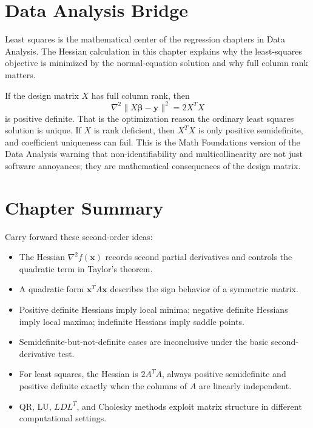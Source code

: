 \section{Data Analysis Bridge}
\label{mf:ch13-data-analysis-bridge}

Least squares is the mathematical center of the regression chapters in Data Analysis. The Hessian calculation in this chapter explains why the least-squares objective is minimized by the normal-equation solution and why full column rank matters.

If the design matrix \(X\) has full column rank, then
\[
    \nabla^2\|X\boldsymbol{\beta}-\mathbf{y}\|^2
    =2X^TX
\]
is positive definite. That is the optimization reason the ordinary least squares solution is unique. If \(X\) is rank deficient, then \(X^TX\) is only positive semidefinite, and coefficient uniqueness can fail. This is the Math Foundations version of the Data Analysis warning that non-identifiability and multicollinearity are not just software annoyances; they are mathematical consequences of the design matrix.

\section{Chapter Summary}
\label{mf:hessians-summary}

Carry forward these second-order ideas:
\begin{itemize}
    \item The Hessian \(\nabla^2 f(\mathbf{x})\) records second partial derivatives and controls the quadratic term in Taylor's theorem.
    \item A quadratic form \(\mathbf{x}^TA\mathbf{x}\) describes the sign behavior of a symmetric matrix.
    \item Positive definite Hessians imply local minima; negative definite Hessians imply local maxima; indefinite Hessians imply saddle points.
    \item Semidefinite-but-not-definite cases are inconclusive under the basic second-derivative test.
    \item For least squares, the Hessian is \(2A^TA\), always positive semidefinite and positive definite exactly when the columns of \(A\) are linearly independent.
    \item QR, LU, \(LDL^T\), and Cholesky methods exploit matrix structure in different computational settings.
\end{itemize}
